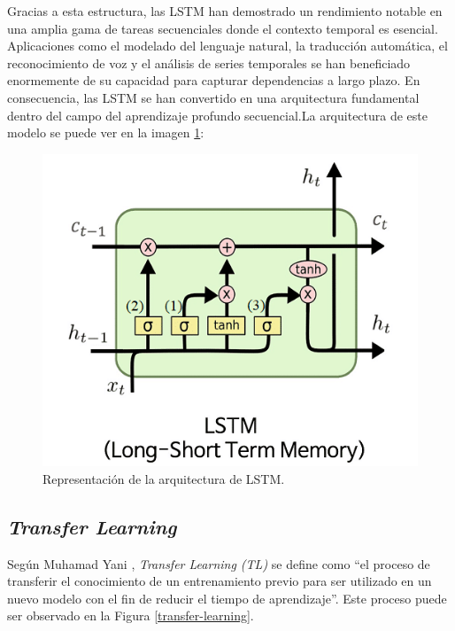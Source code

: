 Gracias a esta estructura, las LSTM han demostrado un 
rendimiento notable en una amplia gama de tareas secuenciales 
donde el contexto temporal es esencial. Aplicaciones como 
el modelado del lenguaje natural, la traducción automática, 
el reconocimiento de voz y el análisis de series temporales 
se han beneficiado enormemente de su capacidad para capturar 
dependencias a largo plazo. En consecuencia, las LSTM se han 
convertido en una arquitectura fundamental dentro del campo 
del aprendizaje profundo secuencial.La arquitectura de este modelo se puede ver en la imagen 
\ref{lstm}:

\begin{figure}[h!] 
    \includegraphics[width=1\textwidth]{images/lstm.png} 
    \centering 
    \caption{Representación de la arquitectura de LSTM\protect\cite{datascientest2024lstm}.} 
    \label{lstm} 
\end{figure}


\subsection{\textit{Transfer Learning}}
Según Muhamad Yani \cite{Yani2019}, 
\textit{Transfer Learning (TL)} se define como ``el proceso de 
transferir el conocimiento de un entrenamiento previo para ser 
utilizado en un nuevo modelo con el fin de reducir el tiempo de 
aprendizaje''. Este proceso puede ser observado en la Figura 
\ref{transfer-learning}.\\

